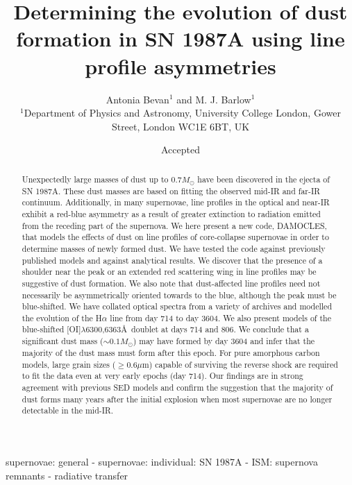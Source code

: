 \documentclass[useAMS,usenatbib,usegraphicx]{mnras}
\title[Determining the evolution of dust formation in SN 1987A using line profile asymmetries]{Determining the evolution of dust formation in SN 1987A using line profile asymmetries}
\author[Antonia Bevan and M. J. Barlow]{Antonia Bevan$^{1}$ and M. J. Barlow$^{1}$\\
$^{1}$Department of Physics and Astronomy, University College London, Gower Street, London WC1E 6BT, UK}
\begin{document}
\date{Accepted}

\pagerange{\pageref{firstpage}--\pageref{lastpage}} 

\maketitle

\label{firstpage}

\begin{abstract}

Unexpectedly large masses of dust up to $0.7M_{\odot}$ have been discovered in the ejecta of SN 1987A.  These dust masses are based on fitting the observed mid-IR and far-IR continuum.  Additionally, in many supernovae, line profiles in the optical and near-IR exhibit a red-blue asymmetry as a result of greater extinction to radiation emitted from the receding part of the supernova.  We here present a new code, DAMOCLES, that models the effects of dust on line profiles of core-collapse supernovae in order to determine masses of newly formed dust.  We have tested the code against previously published models and against analytical results.  We discover that the presence of a shoulder near the peak or an extended red scattering wing in line profiles may be suggestive of dust formation.  We also note that dust-affected line profiles need not necessarily be asymmetrically oriented towards to the blue, although the peak must be blue-shifted. We have collated optical spectra from a variety of archives and modelled the evolution of the H$\alpha$ line from day 714 to day 3604.  We also present models of the blue-shifted [OI]$\lambda$6300,6363\AA\ doublet at days 714 and 806.  We conclude that a significant dust mass ($\sim 0.1M_{\odot}$) may have formed by day 3604 and infer that the majority of the dust mass must form after this epoch.  For pure amorphous carbon models, large grain sizes ($\geqslant 0.6\mu$m) capable of surviving the reverse shock are required to fit the data even at very early epochs (day 714).  Our findings are in strong agreement with previous SED models and confirm the suggestion that the majority of dust forms many years after the initial explosion when most supernovae are no longer detectable in the mid-IR.

\end{abstract}

\begin{keywords}
supernovae: general  -  supernovae: individual: SN 1987A  -  ISM: supernova remnants  - radiative transfer
\end{keywords}
\end{document}
